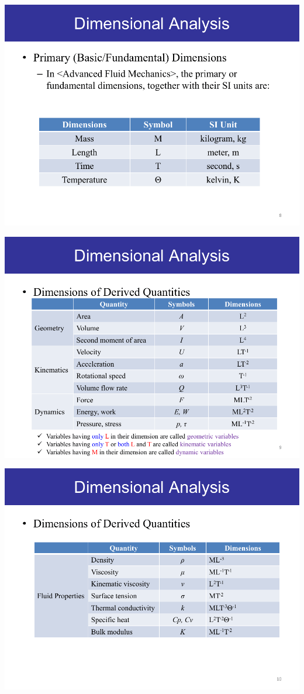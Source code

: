 \begin{center}
    \includegraphics[width=.65\textwidth]{figure/2/dimensional_analysis/1.png}

    \includegraphics[width=.65\textwidth]{figure/2/dimensional_analysis/2.png}

    \includegraphics[width=.65\textwidth]{figure/2/dimensional_analysis/3.png}
\end{center}



